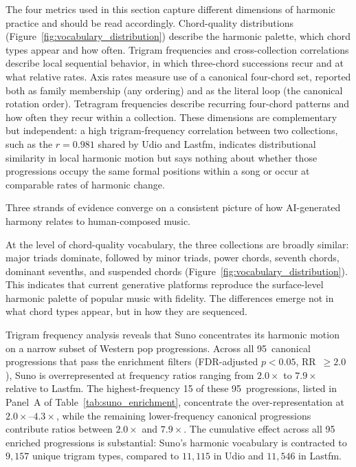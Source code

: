 \documentclass{article}
\begin{document}
The four metrics used in this section capture different dimensions of harmonic practice and should be read accordingly. Chord-quality distributions (Figure~\ref{fig:vocabulary_distribution}) describe the harmonic palette, which chord types appear and how often. Trigram frequencies and cross-collection correlations describe local sequential behavior, in which three-chord successions recur and at what relative rates. Axis rates measure use of a canonical four-chord set, reported both as family membership (any ordering) and as the literal loop (the canonical rotation order). Tetragram frequencies describe recurring four-chord patterns and how often they recur within a collection. These dimensions are complementary but independent: a high trigram-frequency correlation between two collections, such as the $r = 0.981$ shared by Udio and Lastfm, indicates distributional similarity in local harmonic motion but says nothing about whether those progressions occupy the same formal positions within a song or occur at comparable rates of harmonic change.

Three strands of evidence converge on a consistent picture of how AI-generated harmony relates to human-composed music.

At the level of chord-quality vocabulary, the three collections are broadly similar: major triads dominate, followed by minor triads, power chords, seventh chords, dominant sevenths, and suspended chords (Figure~\ref{fig:vocabulary_distribution}). This indicates that current generative platforms reproduce the surface-level harmonic palette of popular music with fidelity. The differences emerge not in what chord types appear, but in how they are sequenced.

Trigram frequency analysis reveals that Suno concentrates its harmonic motion on a narrow subset of Western pop progressions. Across all 95~canonical progressions that pass the enrichment filters (FDR-adjusted $p < 0.05$, RR~$\geq 2.0$), Suno is overrepresented at frequency ratios ranging from $2.0\times$ to $7.9\times$ relative to Lastfm. The highest-frequency 15 of these 95~progressions, listed in Panel~A of Table~\ref{tab:suno_enrichment}, concentrate the over-representation at $2.0\times$--$4.3\times$, while the remaining lower-frequency canonical progressions contribute ratios between $2.0\times$ and $7.9\times$. The cumulative effect across all 95 enriched progressions is substantial: Suno's harmonic vocabulary is contracted to $9,157$ unique trigram types, compared to $11,115$ in Udio and $11,546$ in Lastfm.
\end{document}
